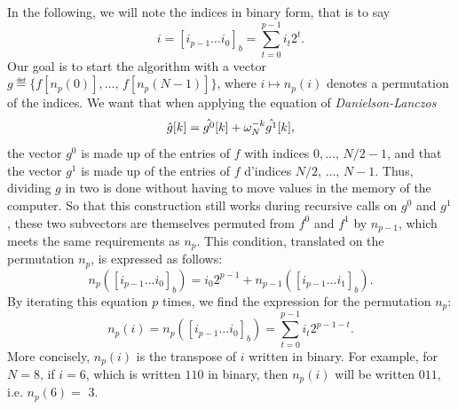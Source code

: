  
In the following, we will note the indices in binary form, that is to say
\begin{equation*}
i = [i_{p-1} \ldots i_0]_b = \sum_{t = 0}^{p-1}{i_t 2^t}.
\end{equation*}
Our goal is to start the algorithm with a vector $ g \eqdef \{f[n_p (0)], \ldots, \, f[n_p (N-1)]\} $, where $ i \mapsto n_p ( i) $ denotes a permutation of the indices. We want that when applying the equation of \textit{Danielson-Lanczos}
\begin{equation}
\label{eq-rec-relation-fft}
\hat{g}[k] = \hat{g^0}[k] + \omega_N^{- k} \hat{g^1}[k],
\end{equation}
the vector $ g^0 $ is made up of the entries of $ f $ with indices $ 0, \ldots, \, N / 2-1 $, and that the vector $ g^1 $ is made up of the entries of $ f $ d'indices $ N / 2, \, \ldots, \, N-1 $. Thus, dividing $ g $ in two is done without having to move values in the memory of the computer. So that this construction still works during recursive calls on $ g^0 $ and $ g^1 $, these two subvectors are themselves permuted from $ f^0 $ and $ f^1 $ by $ n_{p- 1} $, which meets the same requirements as $ n_p $. This condition, translated on the permutation $ n_p $, is expressed as follows:
\begin{equation*}
n_p ([i_{p-1} \ldots i_0]_b) = i_0 2^{p-1} + n_{p-1} ([i_{p-1} \ldots i_1]_b).
\end{equation*}
By iterating this equation $ p $ times, we find the expression for the permutation $ n_p $:
\begin{equation*}
n_p (i) = n_p ([i_{p-1} \ldots i_0]_b) = \sum_{t = 0}^{p-1}{i_t 2^{p-1-t}}.
\end{equation*}
More concisely, $ n_p (i) $ is the transpose of $ i $ written in binary. For example, for $ N = 8 $, if $ i = 6 $, which is written $ 110 $ in binary, then $ n_p (i) $ will be written $ 011 $, i.e. $ n_p ( 6) = $ 3.
 
